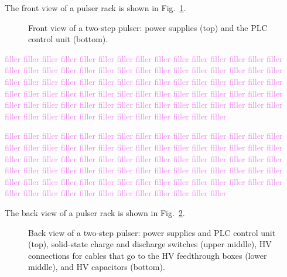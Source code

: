 The front view of a pulser rack is shown in Fig.~\ref{fig:pulser_front}.
\begin{figure}[]
	\centering
	\caption{Front view of a two-step pulser: power supplies (top) and the PLC control unit (bottom).}\label{fig:pulser_front}
\end{figure}

\textcolor{violet}{filler filler filler filler filler filler filler filler filler filler filler filler filler filler filler filler filler filler filler filler filler filler filler filler filler filler filler filler filler filler filler filler filler filler filler filler filler filler filler filler filler filler filler filler filler filler filler filler filler filler filler filler filler filler filler filler filler filler filler filler filler filler filler filler filler filler filler filler filler filler filler filler filler filler filler filler filler filler filler filler filler filler filler filler filler filler filler}

\textcolor{violet}{filler filler filler filler filler filler filler filler filler filler filler filler filler filler filler filler filler filler filler filler filler filler filler filler filler filler filler filler filler filler filler filler filler filler filler filler filler filler filler filler filler filler filler filler filler filler filler filler filler filler filler filler filler filler filler filler filler filler filler filler filler filler filler filler filler filler filler filler filler filler filler filler filler filler filler filler filler filler filler filler filler filler filler filler filler filler filler}

The back view of a pulser rack is shown in Fig.~\ref{fig:pulser_back}.
\begin{figure}[]
	\centering
	\caption{Back view of a two-step pulser: power supplies and PLC control unit (top), solid-state charge and discharge switches (upper middle), HV connections for cables that go to the HV feedthrough boxes (lower middle), and HV capacitors (bottom).}\label{fig:pulser_back}
\end{figure}

